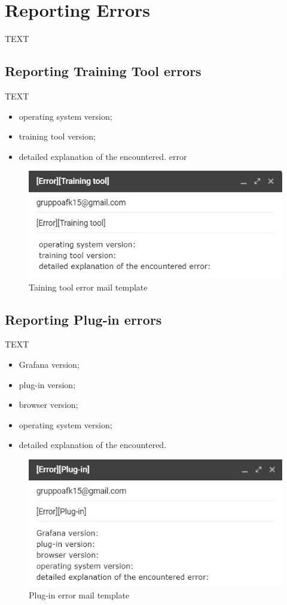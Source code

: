 \section{Reporting Errors}
TEXT


\subsection{Reporting Training Tool errors}
TEXT
\begin{itemize}
	\item operating system version;
	\item training tool version;
	\item detailed explanation of the encountered. error
\end{itemize}

\begin{figure}[H]
\centering
\includegraphics[scale=0.85]{img/mail/tool_mail.jpg}
\caption{Taining tool error mail template}
\end{figure}

\subsection{Reporting Plug-in errors}
TEXT
\begin{itemize}
\item Grafana version;
\item plug-in version;
\item browser version;
\item operating system version;
\item  detailed explanation of the encountered.
\end{itemize}

\begin{figure}[H]
\centering
\includegraphics[scale=0.85]{img/mail/plug-in_mail.jpg}
\caption{Plug-in error mail template}
\end{figure}